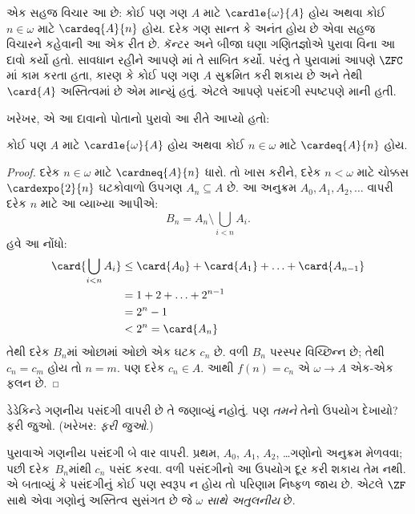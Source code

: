 \documentclass[../../../include/open-logic-section]{subfiles}
\begin{document}
\begin{ex}
એક સહજ વિચાર આ છે: કોઈ પણ ગણ $A$
માટે $\cardle{\omega}{A}$ હોય અથવા
કોઈ $n \in \omega$ માટે
$\cardeq{A}{n}$ હોય. દરેક ગણ સાન્ત કે
અનંત હોય છે એવા સહજ વિચારને કહેવાની
આ એક રીત છે. કૅન્ટર અને બીજા ઘણા
ગણિતજ્ઞોએ પુરાવા વિના આ દાવો કર્યો હતો.
સાવધાન રહીને આપણે
માં
તે સાબિત કર્યો. પરંતુ તે પુરાવામાં આપણે
$\ZFC$માં કામ કરતા હતા, કારણ કે કોઈ
પણ ગણ $A$ સુક્રમિત કરી શકાય છે અને
તેથી $\card{A}$ અસ્તિત્વમાં છે એમ માન્યું
હતું. એટલે આપણે પસંદગી સ્પષ્ટપણે માની હતી.

ખરેખર, \citet{Dedekind1888}એ આ દાવાનો
પોતાનો પુરાવો આ રીતે આપ્યો હતો:

\begin{thm}
કોઈ પણ $A$ માટે $\cardle{\omega}{A}$ હોય
અથવા કોઈ $n \in \omega$ માટે
$\cardeq{A}{n}$ હોય.
\end{thm}

\begin{proof}
દરેક $n \in \omega$ માટે
$\cardneq{A}{n}$ ધારો. તો ખાસ કરીને,
દરેક $n < \omega$ માટે ચોક્કસ
$\cardexpo{2}{n}$ ઘટકોવાળો ઉપગણ
$A_n \subseteq A$ છે. આ અનુક્રમ
$A_0, A_1, A_2, \ldots$ વાપરી દરેક
$n$ માટે આ વ્યાખ્યા આપીએ:
\[
	B_n = A_n \setminus \bigcup_{i < n} A_i.
\]
હવે આ નોંધો:
\begin{align*}
	\card{\bigcup_{i < n}A_i} 
	&\leq \card{A_0} + \card{A_1} + \ldots + \card{A_{n-1}}\\
	&=1 + 2 + \ldots + 2^{n-1}\\
	& = 2^n - 1\\
	& < 2^n = \card{A_n}
\end{align*}
તેથી દરેક $B_n$માં ઓછામાં ઓછો એક
ઘટક $c_n$ છે. વળી $B_n$ પરસ્પર
વિચ્છિન્ન છે; તેથી $c_n = c_m$ હોય
તો $n = m$. પણ દરેક $c_n \in A$.
આથી $f(n) = c_n$ એ
$\omega \to A$ એક-એક ફલન છે.
\end{proof}
\noindent
ડેડેકિન્ડે ગણનીય પસંદગી વાપરી છે તે
જણાવ્યું નહોતું. પણ \emph{તમને} તેનો
ઉપયોગ દેખાયો? ફરી જુઓ. (ખરેખર:
\emph{ફરી જુઓ}.)

પુરાવાએ ગણનીય પસંદગી બે વાર વાપરી.
પ્રથમ, $A_0$, $A_1$, $A_2$, \dots\@ ગણોનો
અનુક્રમ મેળવવા; પછી દરેક~$B_n$માંથી
$c_n$ પસંદ કરવા. વળી પસંદગીનો આ
ઉપયોગ દૂર કરી શકાય તેમ નથી.
\citet[p.~138]{Cohen1966}એ બતાવ્યું કે
પસંદગીનું કોઈ પણ સ્વરૂપ ન હોય તો પરિણામ
નિષ્ફળ જાય છે. એટલે $\ZF$ સાથે એવા
ગણોનું અસ્તિત્વ સુસંગત છે જે
\emph{$\omega$ સાથે અતુલનીય} છે.
\end{ex}
\end{document}
